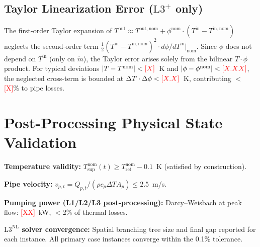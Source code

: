 \documentclass[review,3p]{elsarticle}
\newcommand{\placeholder}[1]{\textcolor{red}{[#1]}}
\newcommand{\Lplus}{\mathrm{L3}^{+}}
\newcommand{\Lnl}{\mathrm{L3}^{\mathrm{NL}}}
\begin{document}
\subsection{Taylor Linearization Error ($\Lplus$ only)}

The first-order Taylor expansion of
$T^{\mathrm{out}} \approx T^{\mathrm{out,nom}}
+ \phi^{\mathrm{nom}} \cdot (T^{\mathrm{in}} - T^{\mathrm{in,nom}})$
neglects the second-order term
$\frac{1}{2} (T^{\mathrm{in}} - T^{\mathrm{in,nom}})^2
\cdot d\phi/dT^{\mathrm{in}}|_{\mathrm{nom}}$.
Since $\phi$ does not depend on $T^{\mathrm{in}}$ (only on
$\dot{m}$), the Taylor error arises solely from the bilinear
$T \cdot \phi$ product. For typical deviations
$|T - T^{\mathrm{nom}}| < \placeholder{X}$~K and
$|\phi - \phi^{\mathrm{nom}}| < \placeholder{X.XX}$, the neglected
cross-term is bounded at
$\Delta T \cdot \Delta \phi < \placeholder{X.X}$~K, contributing
$<$\placeholder{X}\% to pipe losses.

\section{Post-Processing Physical State Validation}
\label{app:state_validation}

\textbf{Temperature validity:}
$T_{\mathrm{sup}}^{\mathrm{nom}}(t)
\geq T_{\mathrm{ret}}^{\mathrm{nom}} - 0.1$~K (satisfied by
construction).

\textbf{Pipe velocity:}
$v_{p,t} = Q_{p,t} / (\rho c_p \Delta T A_p) \leq 2.5$~m/s.

\textbf{Pumping power (L1/L2/L3 post-processing):} Darcy--Weisbach
at peak flow: \placeholder{XX}~kW, $<$2\% of thermal losses.

\textbf{$\Lnl$ solver convergence:} Spatial branching tree size
and final gap reported for each instance. All primary case instances
converge within the 0.1\% tolerance.
\end{document}
